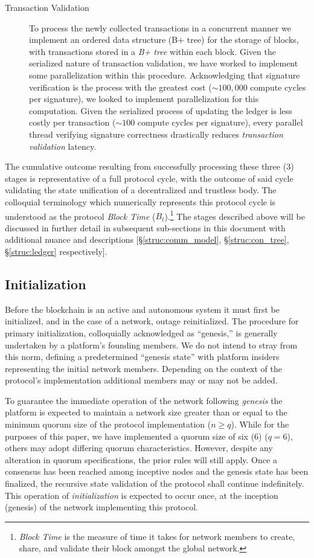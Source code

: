 \begin{description}
\item[Transaction Validation] To process the newly collected transactions in a concurrent manner we implement an ordered data structure (B+ tree) for the storage of blocks, with transactions stored in a \textit{B+ tree} within each block. Given the serialized nature of transaction validation, we have worked to implement some parallelization within this procedure. Acknowledging that signature verification is the process with the greatest cost (\(\sim 100,000\) compute cycles per signature), we looked to implement parallelization for this computation. Given the serialized process of updating the ledger is less costly per transaction (\(\sim 100\) compute cycles per signature), every parallel thread verifying signature correctness drastically reduces \textit{transaction validation} latency.

\end{description}

The cumulative outcome resulting from successfully processing these three (3) stages is representative of a full protocol cycle, with the outcome of said cycle validating the state unification of a decentralized and trustless body. The colloquial terminology which numerically represents this protocol cycle is understood as the protocol \textit{Block Time} (\(B_t\)).\footnote{\textit{Block Time} is the measure of time it takes for network members to create, share, and validate their block amongst the global network.}
The stages described above will be discussed in further detail in subsequent sub-sections in this document with additional nuance and descriptions [\S\ref{struc:comm_model}, \S\ref{struc:con_tree}, \S\ref{struc:ledger} respectively].

\subsection{Initialization}\label{struc:init}
Before the blockchain is an active and autonomous system it must first be initialized, and in the case of a network, outage reinitialized. The procedure for primary initialization, colloquially acknowledged as “genesis,” is generally undertaken by a platform's founding members. We do not intend to stray from this norm, defining a predetermined “genesis state” with platform insiders representing the initial network members. Depending on the context of the protocol's implementation additional members may or may not be added. 

To guarantee the immediate operation of the network following \textit{genesis} the platform is expected to maintain a network size greater than or equal to the minimum quorum size of the protocol implementation (\(n \ge q\)). While for the purposes of this paper, we have implemented a quorum size of six (6) (\(q=6\)), others may adopt differing quorum characteristics. However, despite any alteration in quorum specifications, the prior rules will still apply. Once a consensus has been reached among inceptive nodes and the genesis state has been finalized, the recursive state validation of the protocol shall continue indefinitely. This operation of \textit{initialization} is expected to occur once, at the inception (genesis) of the network implementing this protocol.

